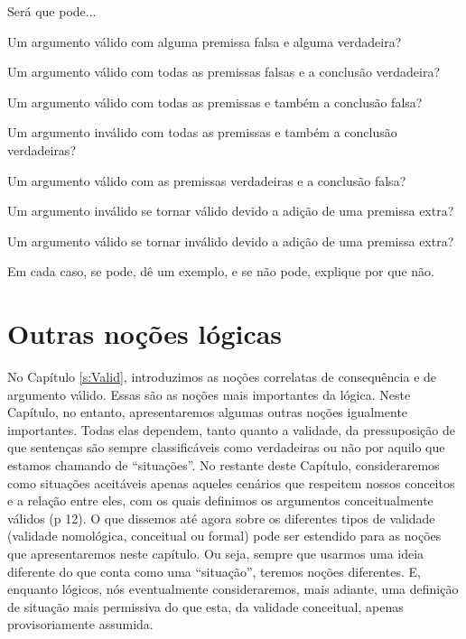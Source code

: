 \problempart
\label{pr.EnglishCombinations}
Será que pode...
	\begin{earg}
		\item Um argumento válido com alguma premissa falsa e alguma verdadeira?
		\item Um argumento válido com todas as premissas falsas e a conclusão verdadeira?
		\item Um argumento válido com todas as premissas e também a conclusão falsa?
		\item Um argumento inválido com todas as premissas e também a conclusão verdadeiras?
		\item Um argumento válido com as premissas verdadeiras e a conclusão falsa?
		\item Um argumento inválido se tornar válido devido a adição de uma premissa extra?
		\item Um argumento válido se tornar inválido devido a adição de uma premissa extra?
	\end{earg}
Em cada caso, se pode, dê um exemplo, e se não pode, explique por que não.




\chapter{Outras noções lógicas}\label{s:BasicNotions}

No Capítulo \ref{s:Valid}, introduzimos as noções correlatas de consequência e de argumento válido.
Essas são as noções mais importantes da lógica.
Neste Capítulo, no entanto, apresentaremos algumas outras noções igualmente importantes.
Todas elas dependem, tanto quanto a validade, da pressuposição de que sentenças são sempre classificáveis como  verdadeiras ou não por aquilo que estamos chamando de ``situações''.
No restante deste Capítulo, consideraremos como situações aceitáveis apenas aqueles cenários que respeitem nossos conceitos e a relação entre eles, com os quais definimos os argumentos conceitualmente válidos (p 12).
O que dissemos até agora sobre os diferentes tipos de validade (validade nomológica, conceitual ou formal) pode ser estendido para as noções que apresentaremos neste capítulo. Ou seja, sempre que usarmos uma ideia diferente do que conta como uma ``situação'', teremos noções diferentes.
E, enquanto lógicos, nós eventualmente consideraremos, mais adiante, uma definição de situação mais permissiva do que esta, da validade conceitual, apenas provisoriamente assumida.

